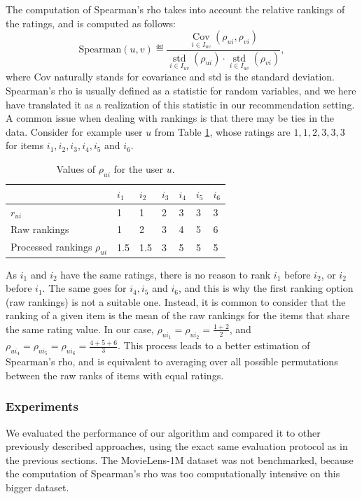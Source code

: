 The computation of Spearman's rho takes into account the relative rankings of
the ratings, and is computed as follows:
$$
\text{Spearman}(u, v) \eqdef \frac{\mathop{\text{Cov}}\limits_{i \in I_{uv}}(\rho_{ui},
\rho_{vi})}{\mathop{\text{std}}\limits_{i \in I_{uv}}(\rho_{ui}) \cdot
\mathop{\text{std}}\limits_{i \in
I_{uv}}(\rho_{vi})},
$$
where Cov naturally stands for covariance and std is the standard deviation.
Spearman's rho is usually defined as a statistic for random variables, and we
here have translated it as a realization of this statistic in our
recommendation setting. A common issue when dealing with rankings is that there
may be ties in the data. Consider for example user $u$ from Table
\ref{TAB:rankings}, whose ratings are $1, 1, 2, 3, 3, 3$ for items $i_1, i_2,
i_3, i_4, i_5$ and $i_6$.
\begin{table}[h!]
\centering
  \begin{tabular}{ l  l  l  l  l  l  l }
\toprule
    & $i_1$ & $i_2$ & $i_3$ & $i_4$ & $i_5$ & $i_6$\\
  \midrule
    $r_{ui}$ & 1 & 1 & 2 & 3 & 3 & 3\\
    Raw rankings & 1 & 2 & 3 & 4 & 5 & 6 \\
    Processed rankings $\rho_{ui}$ & 1.5 & 1.5 & 3 & 5 & 5 & 5 \\
\bottomrule
\end{tabular}
  \caption{Values of $\rho_{ui}$ for the user $u$.}
\label{TAB:rankings}
\end{table}
As $i_1$ and $i_2$ have the same ratings, there is no reason to rank $i_1$
before $i_2$, or $i_2$ before $i_1$. The same goes for $i_4, i_5$ and $i_6$,
and this is why the first ranking option (raw rankings) is not a suitable one.
Instead, it is common to consider that the ranking of a given item is the mean
of the raw rankings for the items that share the same rating value. In our case,
$\rho_{u{i_1}} = \rho_{u{i_2}} = \frac{1 + 2}{2}$, and $ \rho_{u{i_4}} =
\rho_{u{i_5}} =  \rho_{u{i_6}} = \frac{4 + 5 + 6}{3}$.
This process leads to a better estimation of Spearman's rho, and is equivalent
to averaging over all possible permutations between the raw ranks of items with
equal ratings.



\subsubsection{Experiments}

We evaluated the performance of our algorithm and compared it to other
previously described approaches, using the exact same evaluation protocol as in
the previous sections. The MovieLens-1M dataset was not benchmarked, because
the computation of Spearman's rho was too computationally intensive on this
bigger dataset.

